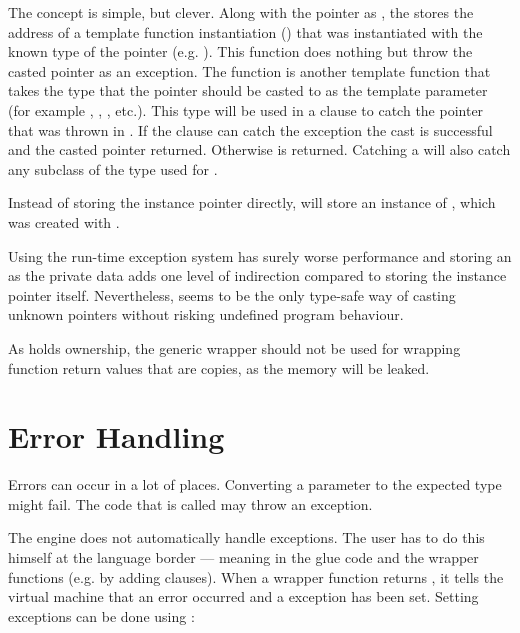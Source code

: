 The concept is simple, but clever. Along with the pointer as , the  stores the address of a template function instantiation () that was instantiated with the known type of the pointer (e.g. ). This function does nothing but throw the casted pointer as an exception. The  function is another template function that takes the type that the pointer should be casted to as the template parameter  (for example , , , etc.). This type will be used in a  clause to catch the pointer that was thrown in . If the  clause can catch the exception the cast is successful and the casted pointer returned. Otherwise  is returned. Catching a  will also catch any subclass of the type used for .

Instead of storing the instance pointer directly,  will store an instance of , which was created with . 

Using the run-time exception system has surely worse performance and storing an  as the private data adds one level of indirection compared to storing the instance pointer itself. Nevertheless,  seems to be the only type-safe way of casting unknown  pointers without risking undefined program behaviour.

As  holds ownership, the generic wrapper should not be used for wrapping function return values that are copies, as the memory will be leaked.

\section{Error Handling}
\label{sec:ErrorHandling}

Errors can occur in a lot of places. Converting a parameter to the expected type might fail. The  code that is called may throw an exception.

The  engine does not automatically handle  exceptions. The  user has to do this himself at the language border --- meaning in the glue code and the wrapper functions (e.g. by adding  clauses). When a wrapper function returns , it tells the virtual machine that an error occurred and a  exception has been set. Setting  exceptions can be done using :

